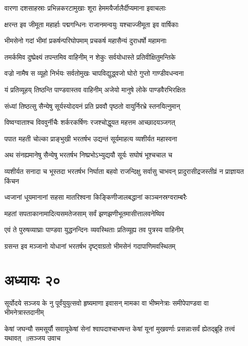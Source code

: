 \twolineshloka
{वारणा दशसाहस्राः प्रभिन्नकरटामुखाः}
{शूरा हेममयैर्जालैर्दीप्यमाना इवाचलाः}


\twolineshloka
{क्षरन्त इव जीमूता महार्हाः पद्मगन्धिनः}
{राजानमन्वयुः यश्चाज्जीमूता इव वार्षिकाः}


\twolineshloka
{भीमसेनो गदां भीमां प्रकर्षन्परिघोपमाम्}
{प्रचकर्ष महासैन्यं दुराधर्षो महामनाः}


\twolineshloka
{तमर्कमिव दुष्प्रेक्ष्यं तपन्तमिव वाहिनीम्}
{न शेकुः सर्वयोधास्ते प्रतिवीक्षितुमन्तिके}


\twolineshloka
{वज्रो नामैष स व्यूहो निर्भयः सर्वतोमुखः}
{चापविद्युद्ध्वजो घोरो गुप्तो गाण्डीवधन्वना}


\twolineshloka
{यं प्रतिव्यूहय् तिष्ठन्ति पाण्डवास्तव वाहिनीम्}
{अजेयो मानुषे लोके पाण्डवैरभिरक्षितः}


\twolineshloka
{संध्यां तिष्ठत्सु सैन्येषु सूर्यस्योदयनं प्रति}
{प्रववौ पृष्ठतो वायुर्निरभ्रे स्तनयित्नुमान्}


\twolineshloka
{विष्वग्वाताश्च विववुर्नीचैः शर्करकर्षिणः}
{रजश्चोद्धूयत महत्तम आच्छादयञ्जगत्}


\twolineshloka
{पपात महती चोल्का प्राङ्भुखी भरतर्षभ}
{उद्यन्तं सूर्यमाहत्य व्यशीर्यत महास्वना}


\twolineshloka
{अथ संनह्यमानेषु सैन्येषु भरतर्षभ}
{निष्प्रभोऽभ्युद्ययौ सूर्यः सघोषं भूश्चचाल च}


\threelineshloka
{व्यशीर्यत सनादा च भूस्तदा भरतर्षभ}
{निर्घाता बहवो राजन्दिक्षु सर्वासु चाभवन्}
{प्रादुरासीद्रजस्तीव्रं न प्राज्ञायत किंचन}


\twolineshloka
{ध्वजानां धूयमानानां सहसा मातरिश्वना}
{किङ्किणीजालबद्धानां काञ्चनस्रग्वराम्बरैः}


\twolineshloka
{महतां सपताकानामादित्यसमतेजसाम्}
{सर्वं झणझणीभूतमासीत्तालवनेष्विव}


\twolineshloka
{एवं ते पुरुषव्याघ्राः पाण्डवा युद्धनन्दिनः}
{व्यवस्थिताः प्रतिव्यूह्य तव पुत्रस्य वाहिनीम्}


\twolineshloka
{ग्रसन्त इव मञ्जानो योधानां भरतर्षभ}
{दृष्ट्वाग्रतो भीमसेनं गदापाणिमवस्थितम्}


\chapter{अध्यायः २०}
\twolineshloka
{सूर्योदये सञ्जय के नु पूर्वंयुयुत्सवो हृष्यमाणा इवासन्}
{मामका वा भीष्मनेत्राः समीपेपाण्डवा वा भीमनेत्रास्तदानीम्}


\threelineshloka
{केषां जघन्यौ समसूर्यौ सवायूकेषां सेनां श्वापदाश्चाभषन्त}
{केषां यूनां मुखवर्णाः प्रसन्नाःसर्वं ह्येतद्ब्रूहि तत्त्वं यथावत् ॥सञ्जय उवाच}
{}


